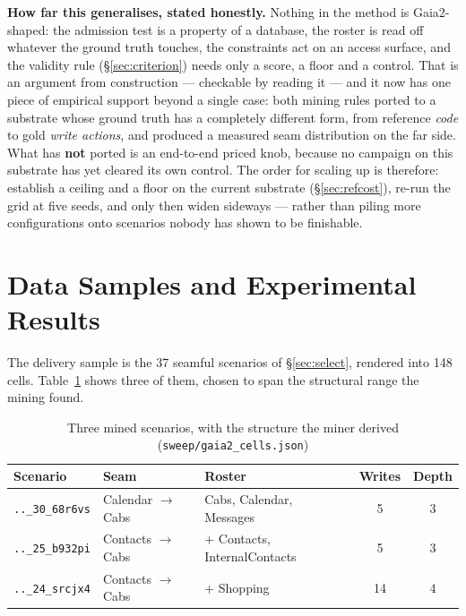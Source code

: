 \documentclass[11pt,a4paper]{article}
\begin{document}
\textbf{How far this generalises, stated honestly.} Nothing in the method is Gaia2-shaped: the admission test is a property of a database, the roster is read off whatever the ground truth touches, the constraints act on an access surface, and the validity rule (\S\ref{sec:criterion}) needs only a score, a floor and a control. That is an argument from construction --- checkable by reading it --- and it now has one piece of empirical support beyond a single case: both mining rules ported to a substrate whose ground truth has a completely different form, from reference \emph{code} to gold \emph{write actions}, and produced a measured seam distribution on the far side. What has \textbf{not} ported is an end-to-end priced knob, because no campaign on this substrate has yet cleared its own control. The order for scaling up is therefore: establish a ceiling and a floor on the current substrate (\S\ref{sec:refcost}), re-run the grid at five seeds, and only then widen sideways --- rather than piling more configurations onto scenarios nobody has shown to be finishable.

\section{Data Samples and Experimental Results}
\label{sec:results}

The delivery sample is the 37 seamful scenarios of \S\ref{sec:select}, rendered into 148 cells. Table~\ref{tab:samples} shows three of them, chosen to span the structural range the mining found.

\begin{table}[H]
\centering
\small
\caption{Three mined scenarios, with the structure the miner derived (\texttt{sweep/gaia2\_cells.json})}
\label{tab:samples}
\begin{tabularx}{\textwidth}{>{\raggedright\arraybackslash}p{2.9cm} >{\raggedright\arraybackslash}p{3.0cm} X c c}
\toprule
Scenario & Seam & Roster & Writes & Depth\\
\midrule
\texttt{..\_30\_68r6vs} & Calendar $\rightarrow$ Cabs & Cabs, Calendar, Messages & 5 & 3\\
\texttt{..\_25\_b932pi} & Contacts $\rightarrow$ Cabs & + Contacts, InternalContacts & 5 & 3\\
\texttt{..\_24\_srcjx4} & Contacts $\rightarrow$ Cabs & + Shopping & 14 & 4\\
\bottomrule
\end{tabularx}
\end{table}
\end{document}
